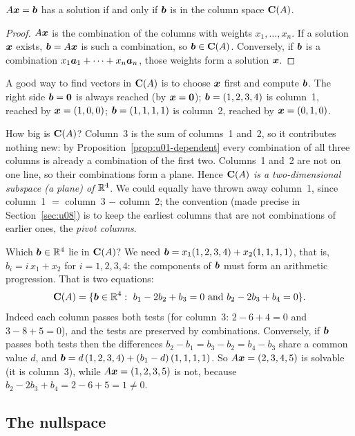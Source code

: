 \begin{theorem}[Solvability]\label{thm:u07-solvable}
$A\boldsymbol{x}=\boldsymbol{b}$ has a solution if and only if $\boldsymbol{b}$ is in the column space $\mathbf{C}(A)$.
\end{theorem}

\begin{proof}
$A\boldsymbol{x}$ is the combination of the columns with weights $x_1,\dots,x_n$. If a solution
$\boldsymbol{x}$ exists, $\boldsymbol{b}=A\boldsymbol{x}$ is such a combination, so $\boldsymbol{b}\in\mathbf{C}(A)$. Conversely,
if $\boldsymbol{b}$ is a combination $x_1\boldsymbol{a}_1+\cdots+x_n\boldsymbol{a}_n$, those weights form a solution
$\boldsymbol{x}$.
\end{proof}

A good way to find vectors in $\mathbf{C}(A)$ is to choose $\boldsymbol{x}$ first and compute $\boldsymbol{b}$. The
right side $\boldsymbol{b}=\boldsymbol{0}$ is always reached (by $\boldsymbol{x}=\boldsymbol{0}$); $\boldsymbol{b}=(1,2,3,4)$ is
column~1, reached by $\boldsymbol{x}=(1,0,0)$; $\boldsymbol{b}=(1,1,1,1)$ is column~2, reached by
$\boldsymbol{x}=(0,1,0)$.

How big is $\mathbf{C}(A)$? Column~3 is the sum of columns~1 and~2, so it contributes nothing new:
by Proposition~\ref{prop:u01-dependent} every combination of all three columns is already a
combination of the first two. Columns~1 and~2 are not on one line, so their combinations form
a plane. Hence \emph{$\mathbf{C}(A)$ is a two-dimensional subspace (a plane) of $\mathbb{R}^4$}. We could
equally have thrown away column~1, since column~1 $=$ column~3 $-$ column~2; the convention
(made precise in Section~\ref{sec:u08}) is to keep the earliest columns that are not
combinations of earlier ones, the \emph{pivot columns}.

\begin{example}\label{ex:u07-colspace}
Which $\boldsymbol{b}\in\mathbb{R}^4$ lie in $\mathbf{C}(A)$? We need $\boldsymbol{b}=x_1(1,2,3,4)+x_2(1,1,1,1)$, that is,
$b_i=i\,x_1+x_2$ for $i=1,2,3,4$: the components of $\boldsymbol{b}$ must form an arithmetic
progression. That is two equations:
\[
  \Col{A}=\{\vb{b}\in\R^4:\ b_1-2b_2+b_3=0\ \text{and}\ b_2-2b_3+b_4=0\}.
\]
Indeed each column passes both tests (for column~3: $2-6+4=0$ and $3-8+5=0$), and the tests are
preserved by combinations. Conversely, if $\boldsymbol{b}$ passes both tests then the differences
$b_2-b_1=b_3-b_2=b_4-b_3$ share a common value $d$, and
$\boldsymbol{b}=d\,(1,2,3,4)+(b_1-d)\,(1,1,1,1)$. So $A\boldsymbol{x}=(2,3,4,5)$ is solvable (it is column~3),
while $A\boldsymbol{x}=(1,2,3,5)$ is not, because $b_2-2b_3+b_4=2-6+5=1\neq0$.
\end{example}

\subsection{The nullspace}

